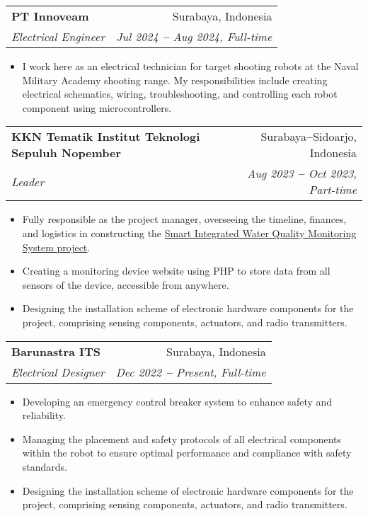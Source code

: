 \documentclass[letterpaper,11pt]{article}
\makeatletter
\newcommand{\resumeItem}[1]{
  \item\small{
    {#1 \vspace{-2pt}}
  }
}
\newcommand{\resumeSubheading}[4]{
  \vspace{-2pt}\item
    \begin{tabular*}{0.97\textwidth}[t]{l@{\extracolsep{\fill}}r}
      \textbf{#1} & #2 \\
      \textit{\small#3} & \textit{\small #4} \\
    \end{tabular*}\vspace{-7pt}
}
\newcommand{\resumeItemListStart}{\begin{itemize}}
\newcommand{\resumeItemListEnd}{\end{itemize}\vspace{-5pt}}
\makeatother
\begin{document}
    \resumeSubheading
      {PT Innoveam}{Surabaya, Indonesia}
      {Electrical Engineer}{Jul 2024 \textbf{--} Aug 2024, Full-time}
        \resumeItemListStart
            \resumeItem{I work here as an electrical technician for target shooting robots at the Naval Military Academy shooting range. My responsibilities include creating electrical schematics, wiring, troubleshooting, and controlling each robot component using microcontrollers.}
    \resumeItemListEnd
    \vspace{2pt}
    \resumeSubheading
      {KKN Tematik Institut Teknologi Sepuluh Nopember}{Surabaya\textbf{--}Sidoarjo, Indonesia}
      {Leader}{Aug 2023 \textbf{--} Oct 2023, Part-time}
        \resumeItemListStart
            \resumeItem{Fully responsible as the project manager, overseeing the timeline, finances, and logistics in constructing the  \href{https://www.its.ac.id/news/2023/09/12/bantu-petambak-abmas-its-gagas-alat-pengontrol-kualitas-air/}{\color{blue}Smart Integrated Water Quality Monitoring System project}.}
            \resumeItem{Creating a monitoring device website using PHP to store data from all sensors of the device, accessible from anywhere.}
            \resumeItem{Designing the installation scheme of electronic hardware components for the project, comprising sensing components, actuators, and radio transmitters.}
        \resumeItemListEnd


    \resumeSubheading
      {Barunastra ITS}{Surabaya, Indonesia}
      {Electrical Designer}{Dec 2022 \textbf{--} Present, Full-time}
        \resumeItemListStart
            \resumeItem{Developing an emergency control breaker system to enhance safety and reliability.}
            \resumeItem{Managing the placement and safety protocols of all electrical components within the robot to ensure optimal performance and compliance with safety standards.}
            \resumeItem{Designing the installation scheme of electronic hardware components for the project, comprising sensing components, actuators, and radio transmitters.}
        \resumeItemListEnd
\end{document}
